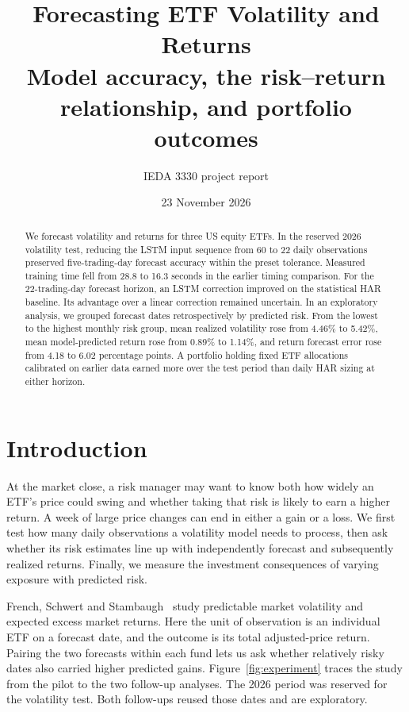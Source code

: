 \documentclass[11pt]{article}
\title{Forecasting ETF Volatility and Returns\\{\large Model accuracy, the risk--return relationship, and portfolio outcomes}}
\author{IEDA 3330 project report}
\date{23 November 2026}
\begin{document}
\maketitle
\begin{abstract}
We forecast volatility and returns for three US equity ETFs. In the reserved 2026 volatility test, reducing the LSTM input sequence from 60 to 22 daily observations preserved five-trading-day forecast accuracy within the preset tolerance. Measured training time fell from 28.8 to 16.3 seconds in the earlier timing comparison. For the 22-trading-day forecast horizon, an LSTM correction improved on the statistical HAR baseline. Its advantage over a linear correction remained uncertain. In an exploratory analysis, we grouped forecast dates retrospectively by predicted risk. From the lowest to the highest monthly risk group, mean realized volatility rose from 4.46\% to 5.42\%, mean model-predicted return rose from 0.89\% to 1.14\%, and return forecast error rose from 4.18 to 6.02 percentage points. A portfolio holding fixed ETF allocations calibrated on earlier data earned more over the test period than daily HAR sizing at either horizon.
\end{abstract}
\begingroup
\hypersetup{hidelinks}
\setcounter{tocdepth}{2}
\tableofcontents
\endgroup
\clearpage
\section{Introduction}
At the market close, a risk manager may want to know both how widely an ETF's price could swing and whether taking that risk is likely to earn a higher return. A week of large price changes can end in either a gain or a loss. We first test how many daily observations a volatility model needs to process, then ask whether its risk estimates line up with independently forecast and subsequently realized returns. Finally, we measure the investment consequences of varying exposure with predicted risk.

French, Schwert and Stambaugh~\cite{french} study predictable market volatility and expected excess market returns. Here the unit of observation is an individual ETF on a forecast date, and the outcome is its total adjusted-price return. Pairing the two forecasts within each fund lets us ask whether relatively risky dates also carried higher predicted gains.
Figure~\ref{fig:experiment} traces the study from the pilot to the two follow-up analyses. The 2026 period was reserved for the volatility test. Both follow-ups reused those dates and are exploratory.
\end{document}
